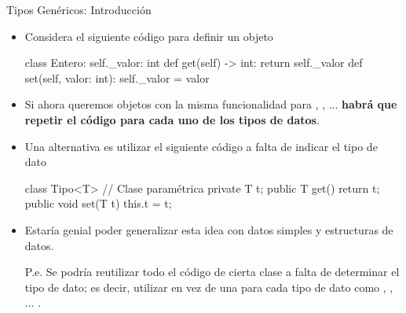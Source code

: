 \documentclass[10pt, envcountsect , spanish]{beamer}
\begin{document}
\begin{frame}[fragile]{Tipos Genéricos: Introducción}  

\begin{itemize}
\item Considera el siguiente código para definir un objeto \; 

{\small
\begin{pyverbatim}[][frame=single]
class Entero:
    self._valor: int
    def get(self) -> int:
        return self._valor
    def set(self, valor: int):
        self._valor = valor
\end{pyverbatim}
}

\item Si ahora queremos objetos con la misma funcionalidad para , , ... \textbf{habrá que repetir el código para cada uno de los tipos de datos}.

\item Una alternativa es utilizar el siguiente código a falta de indicar el tipo de dato 

\begin{code}
class Tipo<T> {  // Clase paramétrica
  private T t;
  public  T   get()    { return t;   }
  public void set(T t) { this.t = t; }
}
\end{code}


\item Estaría genial poder generalizar esta idea con datos simples y estructuras de datos. 

P.e. Se podría reutilizar todo el código de cierta clase  a falta de determinar el tipo de dato; es decir, utilizar  en vez de una para cada tipo de dato como , , ... .

\end{itemize}

\end{frame}
\end{document}
